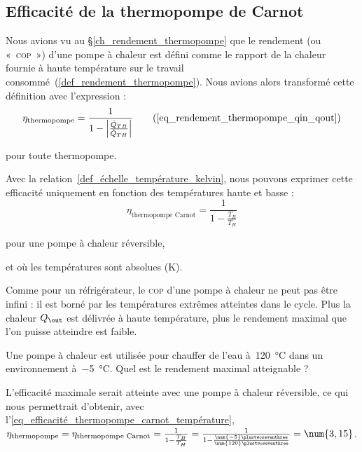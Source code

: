 	\subsection{Efficacité de la thermopompe de Carnot}

		Nous avions vu au \S\ref{ch_rendement_thermopompe} que le rendement (ou «~\textsc{cop}~») d’une pompe à chaleur est défini comme le rapport de la chaleur fournie à haute température sur le travail consommé~(\ref{def_rendement_thermopompe}). Nous avions alors transformé cette définition avec l’expression :
		\begin{equation}
			\eta_\text{thermopompe} = \frac{1}{1 - \left| \frac{\dot Q_{TB}}{\dot Q_{TH}} \right|} \tag{\ref{eq_rendement_thermopompe_qin_qout}}
		\end{equation}
		\begin{equationterms}
			\item pour toute thermopompe.
		\end{equationterms}

		Avec la relation~\ref{def_échelle_température_kelvin}, nous pouvons exprimer cette efficacité uniquement en fonction des températures haute et basse :
		\begin{equation}
			\eta_\text{thermopompe Carnot} = \frac{1}{1 - \frac{T_B}{T_H}}
			\label{eq_efficacité_thermopompe_carnot_température}
		\end{equation}
		\begin{equationterms}
			\item pour une pompe à chaleur réversible,
			\item et où les températures sont absolues (\si{\kelvin}).
		\end{equationterms}

		Comme pour un réfrigérateur, le \textsc{cop} d’une pompe à chaleur ne peut pas être infini : il est borné par les températures extrêmes atteintes dans le cycle. Plus la chaleur $Q_\out$ est délivrée à haute température, plus le rendement maximal que l’on puisse atteindre est faible.
		
		\begin{anexample}
		 	Une pompe à chaleur est utilisée pour chauffer de l’eau à~\SI{120}{\degreeCelsius} dans un environnement à~\SI{-5}{\degreeCelsius}. Quel est le rendement maximal atteignable ?
		 		\begin{answer}
		 			L’efficacité maximale serait atteinte avec une pompe à chaleur réversible, ce qui nous permettrait d’obtenir, avec l’\cref{eq_efficacité_thermopompe_carnot_température}, $\eta_\text{thermopompe} = \eta_\text{thermopompe Carnot} = \frac{1}{1 - \frac{T_B}{T_H}} = \frac{1}{1 - \frac{\num{-5}\plustwoseventhree}{\num{120}\plustwoseventhree}} = \num{3,15}$.
		 		\end{answer}
		 \end{anexample}
